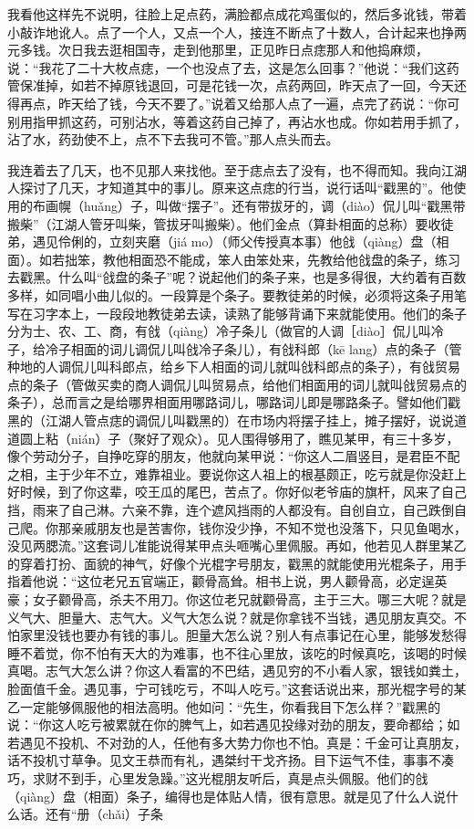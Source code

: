 \documentclass[12pt,UTF8]{ctexbook}
\begin{document}
我看他这样先不说明，往脸上足点药，满脸都点成花鸡蛋似的，然后多讹钱，带着小敲诈地讹人。点了一个人，又点一个人，接连不断点了十数人，合计起来也挣两元多钱。次日我去逛相国寺，走到他那里，正见昨日点痣那人和他捣麻烦，说：“我花了二十大枚点痣，一个也没点了去，这是怎么回事？”他说：“我们这药管保准掉，如若不掉原钱退回，可是花钱一次，点药两回，昨天点了一回，今天还得再点，昨天给了钱，今天不要了。”说着又给那人点了一遍，点完了药说：“你可别用指甲抓这药，可别沾水，等着这药自己掉了，再沾水也成。你如若用手抓了，沾了水，药劲使不上，点不下去我可不管。”那人点头而去。

我连着去了几天，也不见那人来找他。至于痣点去了没有，也不得而知。我向江湖人探讨了几天，才知道其中的事儿。原来这点痣的行当，说行话叫“戳黑的”。他使用的布画幌（huǎng）子，叫做“摆子”。还有带拔牙的，调（diào）侃儿叫“戳黑带搬柴”（江湖人管牙叫柴，管拔牙叫搬柴）。他们金点（算卦相面的总称）要收徒弟，遇见伶俐的，立刻夹磨（jiá mo）（师父传授真本事）他戗（qiàng）盘（相面）。如若拙笨，教他相面恐不能成，笨人由笨处来，先教给他戗盘的条子，练习去戳黑。什么叫“戗盘的条子”呢？说起他们的条子来，也是多得很，大约着有百数多样，如同唱小曲儿似的。一段算是个条子。要教徒弟的时候，必须将这条子用笔写在习字本上，一段段地教徒弟去读，读熟了能够背诵下来就能使用。他们的条子分为士、农、工、商，有戗（qiàng）冷子条儿（做官的人调［diào］侃儿叫冷子，给冷子相面的词儿调侃儿叫戗冷子条儿），有戗科郎（kē lang）点的条子（管种地的人调侃儿叫科郎点，给乡下人相面的词儿就叫戗科郎点的条子），有戗贸易点的条子（管做买卖的商人调侃儿叫贸易点，给他们相面用的词儿就叫戗贸易点的条子），总而言之是给哪界相面用哪路词儿，哪路词儿即是哪路条子。譬如他们戳黑的（江湖人管点痣的调侃儿叫戳黑的）在市场内将摆子挂上，摊子摆好，说说道道圆上粘（nián）子（聚好了观众）。见人围得够用了，瞧见某甲，有三十多岁，像个劳动分子，自挣吃穿的朋友，他就向某甲说：“你这人二眉竖目，是君臣不配之相，主于少年不立，难靠祖业。要说你这人祖上的根基颇正，吃亏就是你没赶上好时候，到了你这辈，咬王瓜的尾巴，苦点了。你好似老爷庙的旗杆，风来了自己挡，雨来了自己淋。六亲不靠，连个遮风挡雨的人都没有。自创自立，自己跌倒自己爬。你那亲戚朋友也是苦害你，钱你没少挣，不知不觉也没落下，只见鱼喝水，没见两腮流。”这套词儿准能说得某甲点头咂嘴心里佩服。再如，他若见人群里某乙的穿着打扮、面貌的神气，好像个光棍字号朋友，戳黑的就能使用光棍条子，用手指着他说：“这位老兄五官端正，颧骨高耸。相书上说，男人颧骨高，必定逞英豪；女子颧骨高，杀夫不用刀。你这位老兄就颧骨高，主于三大。哪三大呢？就是义气大、胆量大、志气大。义气大怎么说？就是你拿钱不当钱，遇见朋友真交。不怕家里没钱也要办有钱的事儿。胆量大怎么说？别人有点事记在心里，能够发愁得睡不着觉，你不怕有天大的为难事，也不往心里放，该吃的时候真吃，该喝的时候真喝。志气大怎么讲？你这人看富的不巴结，遇见穷的不小看人家，银钱如粪土，脸面值千金。遇见事，宁可钱吃亏，不叫人吃亏。”这套话说出来，那光棍字号的某乙一定能够佩服他的相法高明。他如问：“先生，你看我目下怎么样？”戳黑的说：“你这人吃亏被累就在你的脾气上，如若遇见投缘对劲的朋友，要命都给；如若遇见不投机、不对劲的人，任他有多大势力你也不怕。真是：千金可让真朋友，话不投机寸草争。见文王恭而有礼，遇桀纣干戈齐扬。目下运气不佳，事事不凑巧，求财不到手，心里发急躁。”这光棍朋友听后，真是点头佩服。他们的戗（qiàng）盘（相面）条子，编得也是体贴人情，很有意思。就是见了什么人说什么话。还有“册（chǎi）子条
\end{document}

